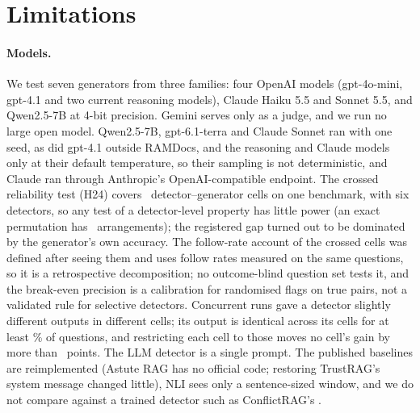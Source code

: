 \section*{Limitations}

\paragraph{Models.} We test seven generators from three families: four OpenAI models (gpt-4o-mini, gpt-4.1 and two
current reasoning models), Claude Haiku 5.5 and Sonnet 5.5, and Qwen2.5-7B at 4-bit precision. Gemini serves only as a judge, and we run
no large open model. Qwen2.5-7B, gpt-6.1-terra and Claude Sonnet ran with one seed, as did gpt-4.1 outside RAMDocs, and the reasoning and Claude models
only at their default temperature, so their sampling is not deterministic, and Claude ran through Anthropic's
OpenAI-compatible endpoint. The crossed reliability test (H24) covers \hTwentyFourCells\ detector--generator cells on one benchmark, with six
detectors, so any test of a detector-level property has little power (an exact permutation has \hRedoNPerm\
arrangements); the registered gap turned out to be dominated by the generator's own accuracy. The follow-rate
account of the crossed cells was defined after seeing them and uses follow rates measured on the same questions, so it
is a retrospective decomposition; no outcome-blind question set tests it, and the break-even precision is a
calibration for randomised flags on true pairs, not a validated rule for selective detectors. Concurrent runs gave
a detector slightly different outputs in different cells; its output is identical across its cells for at least
\frozenShareMin\% of questions, and restricting each cell to those moves no cell's gain by more than \frozenMaxShift\
points. The LLM detector is a single
prompt. The published baselines are reimplemented (Astute RAG has no official code; restoring TrustRAG's system message
changed little), NLI sees only a sentence-sized window, and we do not compare
against a trained detector such as ConflictRAG's \citep{wang2026conflictrag}.

